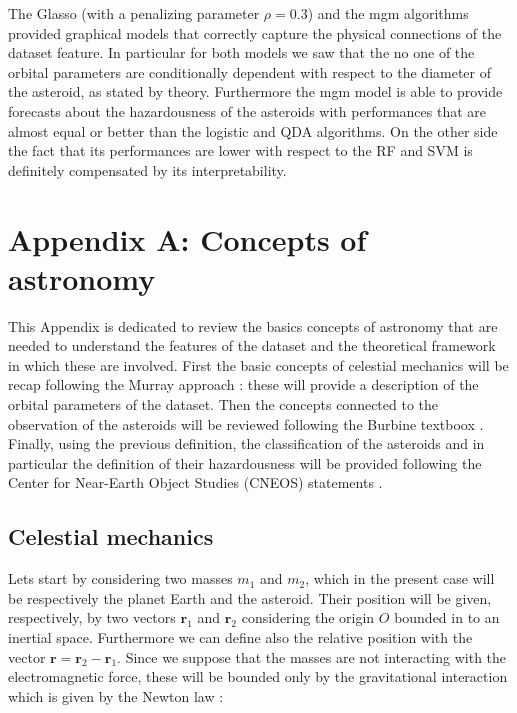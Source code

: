 \documentclass[12pt,%
               a4paper,%
               oneside,openany,%
               titlepage,%
               headinclude,footinclude,%
               BCOR5mm,%
               cleardoublepage=empty,%
               tablecaptionabove,%
               floatperchapter,
               ]{scrreprt}                 %
\begin{document}
The Glasso (with a penalizing parameter $\rho=0.3$) and the mgm algorithms provided graphical models that correctly capture the physical connections of the dataset feature. In particular for both models we saw that the no one of the orbital parameters are conditionally dependent with respect to the diameter of the asteroid, as stated by theory. Furthermore the mgm model is able to provide forecasts about the hazardousness of the asteroids with performances that are almost equal or better  than the logistic and QDA algorithms. On the other side the fact that its performances are lower with respect to the RF and SVM is definitely compensated by its interpretability. 


\chapter{Appendix A: Concepts of astronomy}

This Appendix is dedicated to review the basics concepts of astronomy that are needed to understand the features of the dataset and the theoretical framework in which these are involved. First the basic concepts of celestial mechanics will be recap following the Murray approach \cite{murray1999solar}: these will provide a description of the orbital parameters of the dataset. Then the concepts connected to the observation of the asteroids will be reviewed following the Burbine textboox \cite{burbine2016asteroids}. Finally, using the previous definition, the classification of the asteroids and in particular the definition of their hazardousness will be provided following the Center for Near-Earth Object Studies (CNEOS) statements \cite{nasa_classification}. 

\section{Celestial mechanics}

Lets start by considering two masses $m_{1}$ and $m_{2}$, which in the present case will be respectively the planet Earth and the asteroid. Their position will be given, respectively, by two vectors $\textbf{r}_{1}$ and $\textbf{r}_{2}$ considering the origin $O$ bounded in to an inertial space. Furthermore we can define also the relative position with the vector $\textbf{r}=\textbf{r}_{2}-\textbf{r}_{1}$. Since we suppose that the masses are not interacting with the electromagnetic force, these will be bounded only by the gravitational interaction which is given by the Newton law \cite{murray1999solar}:
\end{document}
